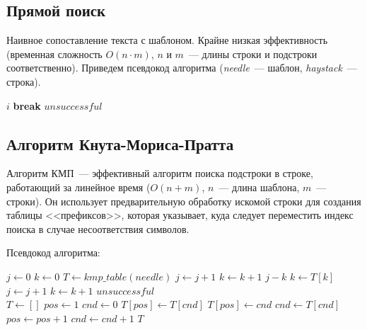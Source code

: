 \subsection{Прямой поиск}
Наивное сопоставление текста с шаблоном. Крайне низкая эффективность (временная сложность \(O(n\cdot m)\), \(n\) и \(m\)~---
длины строки и подстроки соответственно). Приведем псевдокод алгоритма (\textit{needle}~--- шаблон, \textit{haystack}~--- строка).

\begin{algorithmic}
  \Return $i$
  \EndIf
  \State \textbf{break}
  \EndIf
  \EndFor
  \EndFor
  \State
  \Return $unsuccessful$
  \EndFunction
\end{algorithmic}

\subsection{Алгоритм Кнута-Мориса-Пратта}
Алгоритм КМП~--- эффективный алгоритм поиска подстроки в строке, работающий за линейное время (\(O(n + m)\), \(n\)~--- длина шаблона, \(m\)~--- строки).
Он использует предварительную обработку искомой строки для создания таблицы <<префиксов>>,
которая указывает, куда следует переместить индекс поиска в случае несоответствия символов.

Псевдокод алгоритма:

\begin{algorithmic}
  \State $j \gets 0$
  \State $k \gets 0$
  \State $T \gets kmp\_table(needle)$
  \State $j \gets j + 1$
  \State $k \gets k + 1$
  \Return $j - k$
  \Else
  \State $k \gets T\left[k\right]$
  \State $j \gets j + 1$
  \State $k \gets k + 1$
  \EndIf
  \EndIf
  \EndIf
  \EndWhile
  \State
  \Return $unsuccessful$
  \EndFunction\\

  \State $T \gets \left[\right]$
  \State $pos \gets 1$
  \State $cnd \gets 0$
  \State $T\left[pos\right] \gets T\left[cnd\right]$
  \Else
  \State $T\left[pos\right] \gets cnd$
  \State $cnd \gets T\left[cnd\right]$
  \EndWhile
  \EndIf
  \State $pos \gets pos + 1$
  \State $cnd \gets cnd + 1$
  \EndWhile
  \State
  \Return $T$
  \EndFunction
\end{algorithmic}

